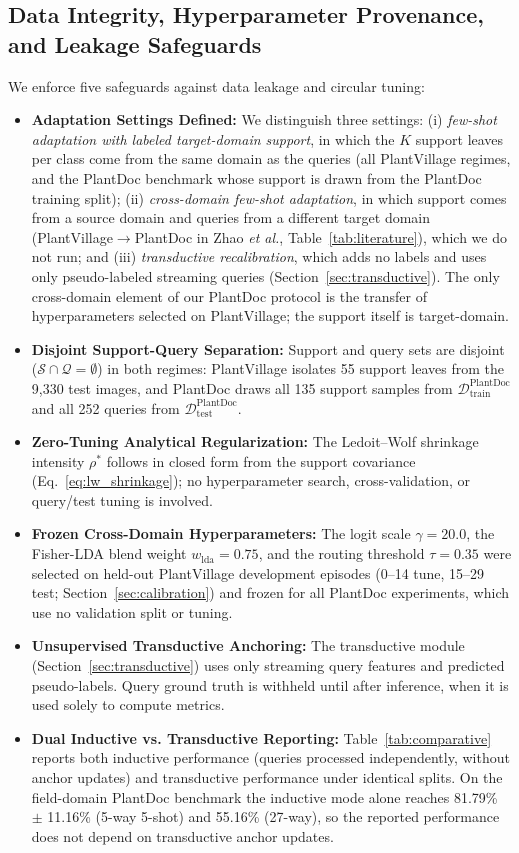 \documentclass[preprint,12pt]{elsarticle}
\begin{document}
\subsection{Data Integrity, Hyperparameter Provenance, and Leakage Safeguards}
\label{sec:integrity}
We enforce five safeguards against data leakage and circular tuning:
\begin{itemize}
    \item \textbf{Adaptation Settings Defined:} We distinguish three settings: (i) \emph{few-shot adaptation with labeled target-domain support}, in which the $K$ support leaves per class come from the same domain as the queries (all PlantVillage regimes, and the PlantDoc benchmark whose support is drawn from the PlantDoc training split); (ii) \emph{cross-domain few-shot adaptation}, in which support comes from a source domain and queries from a different target domain (PlantVillage$\rightarrow$PlantDoc in Zhao \textit{et al.}, Table~\ref{tab:literature}), which we do not run; and (iii) \emph{transductive recalibration}, which adds no labels and uses only pseudo-labeled streaming queries (Section~\ref{sec:transductive}). The only cross-domain element of our PlantDoc protocol is the transfer of hyperparameters selected on PlantVillage; the support itself is target-domain.
    \item \textbf{Disjoint Support-Query Separation:} Support and query sets are disjoint ($\mathcal{S} \cap \mathcal{Q} = \emptyset$) in both regimes: PlantVillage isolates 55 support leaves from the 9,330 test images, and PlantDoc draws all 135 support samples from $\mathcal{D}_{\text{train}}^{\text{PlantDoc}}$ and all 252 queries from $\mathcal{D}_{\text{test}}^{\text{PlantDoc}}$.
    \item \textbf{Zero-Tuning Analytical Regularization:} The Ledoit--Wolf shrinkage intensity $\rho^*$ follows in closed form from the support covariance (Eq.~\ref{eq:lw_shrinkage}); no hyperparameter search, cross-validation, or query/test tuning is involved.
    \item \textbf{Frozen Cross-Domain Hyperparameters:} The logit scale $\gamma = 20.0$, the Fisher-LDA blend weight $w_{\text{lda}} = 0.75$, and the routing threshold $\tau = 0.35$ were selected on held-out PlantVillage development episodes (0--14 tune, 15--29 test; Section~\ref{sec:calibration}) and frozen for all PlantDoc experiments, which use no validation split or tuning.
    \item \textbf{Unsupervised Transductive Anchoring:} The transductive module (Section~\ref{sec:transductive}) uses only streaming query features and predicted pseudo-labels. Query ground truth is withheld until after inference, when it is used solely to compute metrics.
    \item \textbf{Dual Inductive vs. Transductive Reporting:} Table~\ref{tab:comparative} reports both inductive performance (queries processed independently, without anchor updates) and transductive performance under identical splits. On the field-domain PlantDoc benchmark the inductive mode alone reaches 81.79\% $\pm$ 11.16\% (5-way 5-shot) and 55.16\% (27-way), so the reported performance does not depend on transductive anchor updates.
\end{itemize}
\end{document}
